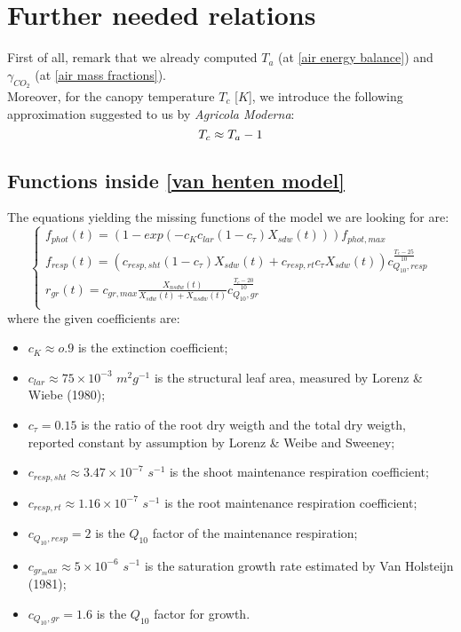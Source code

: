 \section{Further needed relations}
	
First of all, remark that we already computed $T_a$ (at \eqref{air energy balance}) and $\gamma_{CO_2}$ (at \eqref{air mass fractions}).\\
Moreover, for the canopy temperature $T_c$ [$K$],  we introduce the following approximation suggested to us by \emph{Agricola Moderna}:
\begin{equation} \label{canopy temperature}
	T_c \approx{T_a -1}\\
\end{equation}
	
\subsection{Functions inside \eqref{van henten model}}
The equations yielding the missing functions of the model we are looking for are:
\begin{equation} \label{van henten 1}
	\begin{cases}		
		f_{phot}(t) = (1-exp(-c_Kc_{lar}(1-c_\tau)X_{sdw}(t)))f_{phot,max}\\
		f_{resp}(t) = (c_{resp,sht}(1-c_\tau)X_{sdw}(t) + c_{resp,rt}c_\tau X_{sdw}(t))c_{Q_{10},resp}^{\frac{T_c - 25}{10}}\\		
		r_{gr}(t) = c_{gr,max}\frac{X_{nsdw}(t)}{X_{sdw}(t) + X_{nsdw}(t)}c_{Q_{10},gr}^{\frac{T_c - 20}{10}}\\
	\end{cases}
\end{equation}
where the given coefficients are:
\begin{itemize}
	\item $c_{K}\approx{o.9}$ is the extinction coefficient;
	\item $c_{lar}\approx{75\times10^{-3}}$ $m^2g^{-1}$ is the structural leaf area, measured by Lorenz \& Wiebe (1980);
	\item $c_\tau=0.15$ is the ratio of the root dry weigth and the total dry weigth, reported constant by assumption by Lorenz \& Weibe and Sweeney;
	\item $c_{resp,sht}\approx{3.47\times10^{-7}}$ $s^{-1}$ is the shoot maintenance respiration coefficient;
	\item $c_{resp,rt}\approx{1.16\times10^{-7}}$ $s^{-1}$ is the root maintenance respiration coefficient;
	\item $c_{Q_{10},resp}=2$ is the $Q_{10}$ factor of the maintenance respiration;
	\item $c_{gr_max}\approx{5\times10^{-6}}$ $s^{-1}$ is the saturation growth rate estimated by Van Holsteijn (1981);
	\item $c_{Q_{10},gr}=1.6$ is the $Q_{10}$ factor for growth.
\end{itemize}
	
